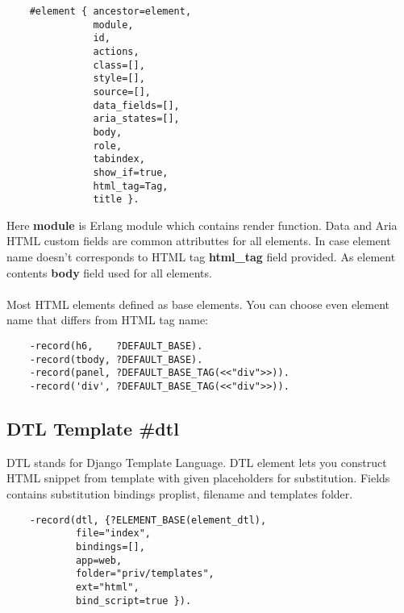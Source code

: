 \vspace{1\baselineskip}
\begin{lstlisting}
    #element { ancestor=element,
               module,
               id,
               actions,
               class=[],
               style=[],
               source=[],
               data_fields=[],
               aria_states=[],
               body,
               role,
               tabindex,
               show_if=true,
               html_tag=Tag,
               title }.
\end{lstlisting}
\vspace{1\baselineskip}

Here {\bf module} is Erlang module which contains render function.
Data and Aria HTML custom fields are common attributtes for all elements.
In case element name doesn't corresponds to HTML tag {\bf html\_tag} field provided.
As element contents {\bf body} field used for all elements.

\paragraph{}
Most HTML elements defined as base elements. You can choose even element
name that differs from HTML tag name:

\vspace{1\baselineskip}
\begin{lstlisting}
    -record(h6,    ?DEFAULT_BASE).
    -record(tbody, ?DEFAULT_BASE).
    -record(panel, ?DEFAULT_BASE_TAG(<<"div">>)).
    -record('div', ?DEFAULT_BASE_TAG(<<"div">>)).
\end{lstlisting}
\vspace{1\baselineskip}

\newpage
\subsection{DTL Template {\bf \#dtl}}
DTL stands for Django Template Language. DTL element lets you construct HTML
snippet from template with given placeholders for substitution.
Fields contains substitution bindings proplist, filename and templates folder.

\vspace{1\baselineskip}
\begin{lstlisting}
    -record(dtl, {?ELEMENT_BASE(element_dtl),
            file="index",
            bindings=[],
            app=web,
            folder="priv/templates",
            ext="html",
            bind_script=true }).
\end{lstlisting}
\vspace{1\baselineskip}

